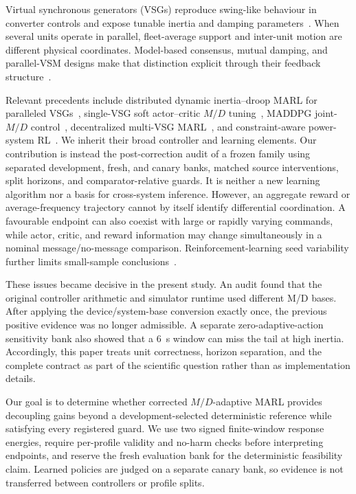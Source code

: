\documentclass[conference,a4paper]{IEEEtran}
\begin{document}
Virtual synchronous generators (VSGs) reproduce swing-like behaviour in
converter controls and expose tunable inertia and damping
parameters~\cite{zhong2011synchronverters,darco2013vsm,wu2016smallsignal}.
When several units operate in parallel, fleet-average support and inter-unit
motion are different physical coordinates. Model-based consensus, mutual
damping, and parallel-VSM designs make that distinction explicit through their
feedback structure~\cite{liu2020consensus,shi2021restoration,fu2022mutual,
gao2024mutual,wang2024consensus,gonzalez2022parallel}.

Relevant precedents include distributed dynamic inertia--droop MARL for
paralleled VSGs~\cite{yang2023ddic}, single-VSG soft actor--critic $M/D$
tuning~\cite{lu2024sac}, MADDPG joint-$M/D$ control~\cite{zhang2024maddpg},
decentralized multi-VSG MARL~\cite{kang2025madrl}, and constraint-aware
power-system RL~\cite{tabas2022safe,shuai2025safe}. We inherit their broad
controller and learning elements. Our contribution is instead the
post-correction audit of a frozen family using separated development, fresh,
and canary banks, matched source interventions, split horizons, and
comparator-relative guards. It is neither a new learning algorithm nor a basis
for cross-system inference.
However, an aggregate reward or average-frequency trajectory cannot by itself
identify differential coordination. A favourable endpoint can also coexist
with large or rapidly varying commands, while actor, critic, and reward
information may change simultaneously in a nominal message/no-message
comparison. Reinforcement-learning seed variability further limits
small-sample conclusions~\cite{agarwal2021statistical}.

These issues became decisive in the present study. An audit found that the
original controller arithmetic and simulator runtime used different M/D bases.
After applying the device/system-base conversion exactly once, the previous
positive evidence was no longer admissible. A separate zero-adaptive-action
sensitivity bank also showed that a \SI{6}{s} window can miss the tail at high
inertia.
Accordingly, this paper treats unit correctness, horizon separation, and the
complete contract as part of the scientific question rather than
as implementation details.

Our goal is to determine whether corrected $M/D$-adaptive MARL provides
decoupling gains beyond a development-selected deterministic reference while satisfying
every registered guard. We use two signed
finite-window response energies, require per-profile validity and no-harm
checks before interpreting endpoints, and reserve the fresh evaluation bank
for the deterministic feasibility claim. Learned policies are judged on a
separate canary bank, so evidence is not transferred between controllers or
profile splits.
\end{document}
